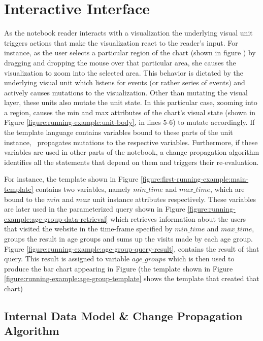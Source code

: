 \section{Interactive Interface}
\label{section:interactive-interface}



As the notebook reader interacts with a visualization the underlying visual unit triggers actions that make the visualization react to the reader's input. For instance, as the user selects a particular region of the chart (shown in figure ) by dragging and dropping the mouse over that particular area, she causes the visualization to zoom into the selected area. This behavior is dictated by the underlying visual unit which listens for events (or rather series of events) and actively causes mutations to the visualization. Other than mutating the visual layer, these units also mutate the unit state. In this particular case, zooming into a region, causes the min and max attributes of the chart's visual state (shown in Figure \ref{figure:running-example:unit-body}, in lines 5-6) to mutate accordingly. If the template language contains variables bound to these parts of the unit instance, \projname\ propagates mutations to the respective variables. Furthermore, if these variables are used in other parts of the notebook, a change propagation algorithm identifies all the statements that depend on them and triggers their re-evaluation.


For instance, the template shown in Figure \ref{figure:first-running-example:main-template} contains two variables, namely $min\_time$ and $max\_time$, which are bound to the $min$ and $max$ unit instance attributes respectively. These variables are later used in the parameterized query shown in Figure \ref{figure:running-example:age-group-data-retrieval} which retrieves information about the users that visited the website in the time-frame specified by $min\_time$ and $max\_time$, groups the result in age groups and sums up the visits made by each age group. Figure \ref{figure:running-example:age-group-query-result}, contains the result of that query. This result is assigned to variable $age\_groups$ which is then used to produce the bar chart appearing in Figure  (the template shown in Figure \ref{figure:running-example:age-group-template} shows the template that created that chart)


\subsection{Internal Data Model \& Change Propagation Algorithm}
\label{section:change-propagation-datamodel}

